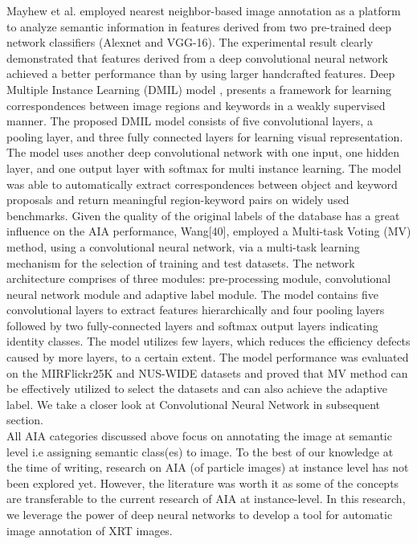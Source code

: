 \documentclass[conference]{IEEEtran}
\begin{document}
		Mayhew et al.\cite{Mayhew} employed nearest neighbor-based image annotation as a platform to analyze semantic information in features derived from two
pre-trained deep network classifiers (Alexnet and VGG-16). The experimental result clearly
demonstrated that features derived from a deep convolutional neural network achieved
a better performance than by using larger handcrafted features. Deep Multiple Instance
Learning (DMIL) model \cite{Kai}, presents a framework for learning correspondences between image regions and keywords in a weakly supervised manner. The
proposed DMIL model consists of five convolutional layers, a pooling layer, and three fully connected layers for learning visual representation. The model uses another deep convolutional network with one input, one hidden layer, and one output layer with softmax for multi instance learning. The model was able to automatically extract correspondences
		between object and keyword proposals and return meaningful region-keyword pairs on widely used benchmarks. Given the quality of the original labels of the database has a great influence on the AIA performance, Wang[40], employed a Multi-task Voting (MV) method, using a convolutional neural network, via a multi-task learning mechanism for the selection of training and test datasets. The network architecture comprises of three modules:
pre-processing module, convolutional neural network module and adaptive label module. The model contains five convolutional layers to extract features hierarchically and four pooling layers followed by two fully-connected layers and softmax output layers indicating identity classes. The model utilizes few layers, which reduces the efficiency defects caused by more layers, to a certain extent. The model performance was evaluated on the MIRFlickr25K and NUS-WIDE datasets and proved that MV method can be effectively utilized to select the datasets and can also achieve the adaptive label. We take a closer look at Convolutional Neural Network in subsequent section.\\
		
		All AIA categories discussed above focus on annotating the image at semantic level i.e
assigning semantic class(es) to image. To the best of our knowledge at the time
of writing, research on AIA (of particle images) at instance level has not been explored yet. However, the
literature was worth it as some of the concepts are transferable to the current research of
AIA at instance-level. In this research, we leverage the power of deep neural networks to
develop a tool for automatic image annotation of XRT images.
	
\end{document}
